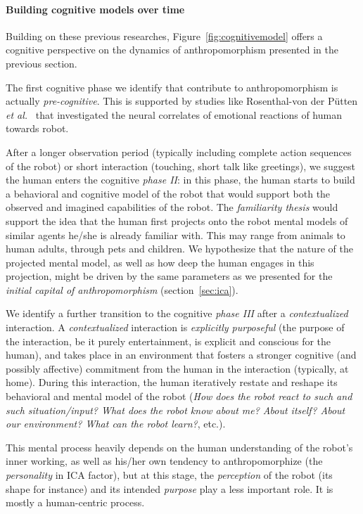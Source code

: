 \documentclass{acm_proc_article-sp}
\begin{document}
\paragraph{Building cognitive models over time}

Building on these previous researches, Figure~\ref{fig:cognitivemodel} offers a
cognitive perspective on the dynamics of anthropomorphism presented in the
previous section.

The first cognitive phase we identify that contribute to anthropomorphism is
actually \emph{pre-cognitive}. This is supported by studies like Rosenthal-von
der Pütten \textit{et al.}~\cite{rosenthal-vonderputten_experimental_2013} that
investigated the neural correlates of emotional reactions of human towards
robot.

After a longer observation period (typically including complete action
sequences of the robot) or short interaction (touching, short talk like
greetings), we suggest the human enters the cognitive \emph{phase II}: in this
phase, the human starts to build a behavioral and cognitive model of the robot
that would support both the observed and imagined capabilities of the robot.
The \emph{familiarity thesis} would support the idea that
the human first projects onto the robot mental models of similar agents he/she
is already familiar with. This may range from animals to human adults, through
pets and children. We hypothesize that the nature of the projected mental
model, as well as how deep the human engages in this projection, might be
driven by the same parameters as we presented for the \emph{initial capital of
anthropomorphism} (section~\ref{sec:ica}).

We identify a further transition to the cognitive \emph{phase III} after a
\emph{contextualized} interaction. A \emph{contextualized} interaction is
\emph{explicitly purposeful} (the purpose of the interaction, be it purely
entertainment, is explicit and conscious for the human), and takes place in an
environment that fosters a stronger cognitive (and possibly affective)
commitment from the human in the interaction (typically, at home). During this
interaction, the human iteratively restate and reshape its behavioral and
mental model of the robot (\emph{How does the robot react to such and such
situation/input? What does the robot know about me? About itself? About our
environment? What can the robot learn?}, etc.).

This mental process heavily depends on the human understanding of the robot's
inner working, as well as his/her own tendency to anthropomorphize (the
\emph{personality} in ICA factor), but at this stage, the \emph{perception} of
the robot (its shape for instance) and its intended \emph{purpose} play a less
important role. It is mostly a human-centric process.
\end{document}
